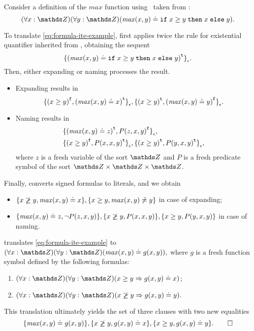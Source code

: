 \begin{example} Consider a definition of the $\mathit{max}$ function using \ITE\ taken from \cite{VampireAndFOOL}:
\begin{equation}\label{eq:formula-ite-example}
  (\forall x:\Z)(\forall y:\Z)(\mathit{max}(x, y) \eql \ite{x \geq y}{x}{y}).
\end{equation}

To translate \eqref{eq:formula-ite-example}, \nfcnf{} first applies twice the rule for existential quantifier inherited from \newcnf, obtaining the sequent $${ \{ {(\mathit{max}(x, y) \doteq \mathtt{if}\;{x \geq y}\;\allowbreak\mathtt{then}\;{x}\;\allowbreak\mathtt{else}\;{y})}^{\mathtt{t}} \} }_{\epsilon}.$$ Then, either expanding or naming processes the result.
\begin{itemize}
  \item Expanding results in $${ \{ {(x \geq y)}^{\mathtt{f}}, {(\mathit{max}(x,y) \doteq x)}^{\mathtt{t}} \} }_{\epsilon},
  { \{ {(x \geq y)}^{\mathtt{t}}, {(\mathit{max}(x,y) \doteq y)}^{\mathtt{f}} \} }_{\epsilon}.$$
  \item Naming results in
  \begin{align*}
  &{ \{ {(\mathit{max}(x,y)\doteq z)}^{\mathtt{t}}, {P(z, x, y)}^{\mathtt{f}} \} }_{\epsilon},\\
  &{ \{ {(x \geq y)}^{\mathtt{f}}, {P(x,x,y)}^{\mathtt{t}} \} }_{\epsilon},
  { \{ {(x \geq y)}^{\mathtt{t}}, {P(y,x,y)}^{\mathtt{t}} \} }_{\epsilon},
  \end{align*}
  where $z$ is a fresh variable of the sort $\Z$ and $P$ is a fresh predicate symbol of the sort $\Z \times \Z \times \Z$.
\end{itemize}

Finally, \newcnf{} converts signed formulas to literals, and we obtain
\begin{itemize}
  \item $\{ x \not\geq y, \mathit{max}(x,y) \doteq x \}, \{ x \geq y, \mathit{max}(x,y) \not\doteq y \}$ in case of expanding;
  \item $\{ \mathit{max}(x,y)\doteq z, \neg P(z, x, y) \},
  \{ x \not\geq y, P(x,x,y) \},
  \{ x \geq y, P(y,x,y) \}$ in case of naming.
\end{itemize}

\oldcnf{} translates \eqref{eq:formula-ite-example} to $(\forall x:\Z)(\forall y:\Z)(\mathit{max}(x, y) \eql g(x, y)),$ where $g$ is a fresh function symbol defined by the following formulas:
\begin{enumerate}
  \item $(\forall x:\Z)(\forall y:\Z)(x \geq y \implies g(x, y) \eql x)$;
  \item $(\forall x:\Z)(\forall y:\Z)(x \not\geq y \implies g(x, y) \eql y).$
\end{enumerate}
This translation ultimately yields the set of three clauses with two new equalities
\begin{equation*}
\{\mathit{max}(x,y) \eql g(x,y)\}, \{x \not\geq y, g(x,y) \eql x\}, \{x \geq y, g(x,y) \eql y\}.\QED
\end{equation*}
\end{example}

